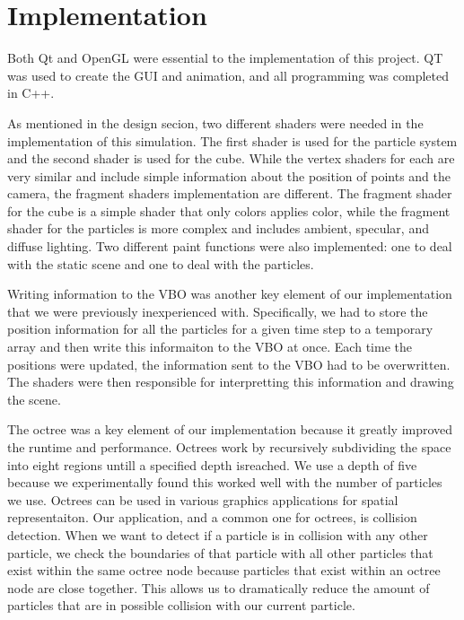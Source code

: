 \section{Implementation}



Both Qt and OpenGL were essential to the implementation of this project. QT was used to create 
the GUI and animation, and all programming was completed in C++.

As mentioned in the design secion, two different shaders were needed in the implementation 
of this simulation.
The first shader is used for the particle system and the second shader is used for the cube. 
While the vertex shaders for each are very similar and include simple information about the
position of points and the camera, the fragment shaders implementation are different.  The fragment
shader for the cube is a simple shader that only colors applies color, while the
fragment shader for the particles is more complex and includes ambient, specular, and diffuse
lighting. Two different paint functions were also implemented: one to deal with the static
scene and one to deal with the particles.

Writing information to the VBO was another key element of our implementation that we were
previously inexperienced with. Specifically, we had to store the position information for 
all the particles for a given time step to a temporary array and then write this informaiton
to the VBO at once. Each time the positions were updated, the information sent to the VBO
had to be overwritten. The shaders were then responsible for interpretting this information
and drawing the scene.

The octree was a key element of our implementation because it greatly improved the runtime 
and performance. Octrees work by recursively subdividing the space into eight regions untill
a specified depth isreached. We use a depth of five because we experimentally found this
worked well with the number of particles we use. Octrees can be used in various graphics
applications for spatial 
representaiton. Our application, and a common one for octrees, is collision detection.
When we want to detect if a particle is in collision with any other particle, we check 
the boundaries of that particle with all other particles that exist within the same
octree node because particles that exist within an octree node are close together.
This allows us to dramatically reduce the amount of particles that 
are in possible collision with our current particle.

